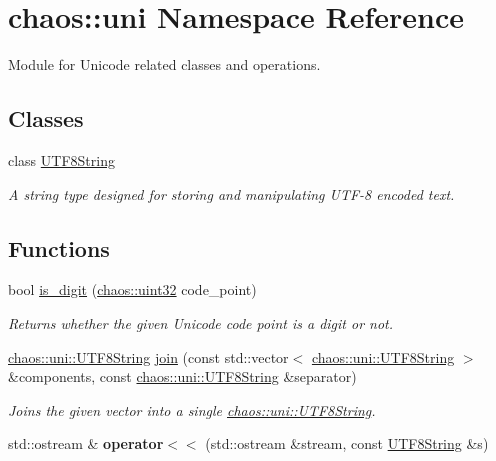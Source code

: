\hypertarget{namespacechaos_1_1uni}{\section{chaos\-:\-:uni Namespace Reference}
\label{namespacechaos_1_1uni}
}


Module for Unicode related classes and operations.  


\subsection*{Classes}
\begin{DoxyCompactItemize}
\item 
class \hyperlink{classchaos_1_1uni_1_1_u_t_f8_string}{U\-T\-F8\-String}
\begin{DoxyCompactList}\small\item\em A string type designed for storing and manipulating U\-T\-F-\/8 encoded text. \end{DoxyCompactList}\end{DoxyCompactItemize}
\subsection*{Functions}
\begin{DoxyCompactItemize}
\item 
bool \hyperlink{namespacechaos_1_1uni_a25a7549a0378aeac227c881220c23640}{is\-\_\-digit} (\hyperlink{namespacechaos_a3b3a47ba1e284655bf1a30c441121c60}{chaos\-::uint32} code\-\_\-point)
\begin{DoxyCompactList}\small\item\em Returns whether the given Unicode code point is a digit or not. \end{DoxyCompactList}\item 
\hyperlink{classchaos_1_1uni_1_1_u_t_f8_string}{chaos\-::uni\-::\-U\-T\-F8\-String} \hyperlink{namespacechaos_1_1uni_ad2a77983423c8b10e2b18cae6f35d329}{join} (const std\-::vector$<$ \hyperlink{classchaos_1_1uni_1_1_u_t_f8_string}{chaos\-::uni\-::\-U\-T\-F8\-String} $>$ \&components, const \hyperlink{classchaos_1_1uni_1_1_u_t_f8_string}{chaos\-::uni\-::\-U\-T\-F8\-String} \&separator)
\begin{DoxyCompactList}\small\item\em Joins the given vector into a single \hyperlink{classchaos_1_1uni_1_1_u_t_f8_string}{chaos\-::uni\-::\-U\-T\-F8\-String}. \end{DoxyCompactList}\item 
\hypertarget{namespacechaos_1_1uni_ab20a8223562ec1ee8f663bda07c7a3ad}{std\-::ostream \& {\bfseries operator$<$$<$} (std\-::ostream \&stream, const \hyperlink{classchaos_1_1uni_1_1_u_t_f8_string}{U\-T\-F8\-String} \&s)}\label{namespacechaos_1_1uni_ab20a8223562ec1ee8f663bda07c7a3ad}

\end{DoxyCompactItemize}


